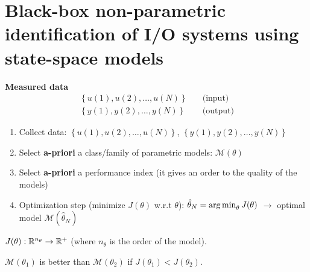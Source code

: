 \chapter{Black-box non-parametric identification of I/O systems using state-space models}

\begin{figure}[H]
    \centering
\end{figure}

\textbf{Measured data}
\begin{align*}
    \left\{u(1), u(2), \ldots, u(N)\right\} &\quad \text{(input)} \\
    \left\{y(1), y(2), \ldots, y(N)\right\} &\quad \text{(output)}
\end{align*}

\begin{remark}

\begin{enumerate}
    \item Collect data: $\left\{u(1), u(2), \ldots, u(N)\right\}$, $\left\{y(1), y(2), \ldots, y(N)\right\}$
    \item Select \textbf{a-priori} a class/family of parametric models: $\mathcal{M}(\theta)$
    \item Select \textbf{a-priori} a performance index (it gives an order to the quality of the models)
    \item Optimization step (minimize $J(\theta)$ w.r.t $\theta$): $\hat{\theta}_N = \operatorname*{arg\,min}_\theta J(\theta)$ $\rightarrow$ optimal model $\mathcal{M}(\hat{\theta}_N)$
\end{enumerate}

$J(\theta): \mathbb{R}^{n_\theta} \rightarrow \mathbb{R}^+$ (where $n_\theta$ is the order of the model).

$\mathcal{M}(\theta_1)$ is better than $\mathcal{M}(\theta_2)$ if $J(\theta_1) < J(\theta_2)$.

\end{remark}

